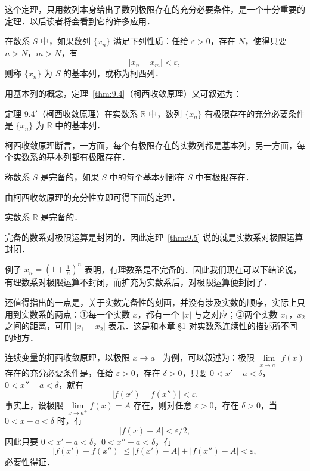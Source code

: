 这个定理，只用数列本身给出了数列极限存在的充分必要条件，是一个十分重要的定理．以后读者将会看到它的许多应用．

\begin{definition}\label{def:9.3}
在数系 $S$ 中，如果数列 $\{x_n\}$ 满足下列性质：任给 $\varepsilon > 0$，存在 $N$，使得只要 $n > N$，$m > N$，有
\[
|x_n - x_m| < \varepsilon,
\]
则称 $\{x_n\}$ 为 $S$ 的基本列，或称为柯西列．
\end{definition}

用基本列的概念，定理~\ref{thm:9.4}（柯西收敛原理）又可叙述为：

{\thmheadfont 定理 9.4$'$（柯西收敛原理）}\quad 在实数系 $\mathbb{R}$ 中，数列 $\{x_n\}$ 有极限存在的充分必要条件是 $\{x_n\}$ 为 $\mathbb{R}$ 中的基本列．

柯西收敛原理断言，一方面，每个有极限存在的实数列都是基本列，另一方面，每个实数系的基本列都有极限存在．

\begin{definition}\label{def:9.4}
称数系 $S$ 是完备的，如果 $S$ 中的每个基本列都在 $S$ 中有极限存在．
\end{definition}

由柯西收敛原理的充分性立即可得下面的定理．

\begin{theorem}[柯西]\label{thm:9.5}
实数系 $\mathbb{R}$ 是完备的．
\end{theorem}

完备的数系对极限运算是封闭的．因此定理~\ref{thm:9.5} 说的就是实数系对极限运算封闭．

例子 $x_n = \left( 1 + \frac{1}{n} \right)^n$ 表明，有理数系是不完备的．因此我们现在可以下结论说，有理数系对极限运算不封闭，而扩充为实数系后，对极限运算便封闭了．

还值得指出的一点是，关于实数完备性的刻画，并没有涉及实数的顺序，实际上只用到实数系的两点：①每一个实数 $x$，都有一个 $|x|$ 与之对应；②两个实数 $x_1$，$x_2$ 之间的距离，可用 $|x_1 - x_2|$ 表示．这是和本章 §1 对实数系连续性的描述所不同的地方．

连续变量的柯西收敛原理，以极限 $x \to a^+$ 为例，可以叙述为：极限 $\lim\limits_{x \to a^+} f(x)$ 存在的充分必要条件是，任给 $\varepsilon > 0$，存在 $\delta > 0$，只要 $0 < x' - a < \delta$，$0 < x'' - a < \delta$，就有
\[
|f(x') - f(x'')| < \varepsilon.
\]
事实上，设极限 $\lim\limits_{x \to a^+} f(x) = A$ 存在，则对任意 $\varepsilon > 0$，存在 $\delta > 0$，当 $0 < x - a < \delta$ 时，有
\[
|f(x) - A| < \varepsilon/2,
\]
因此只要 $0 < x' - a < \delta$，$0 < x'' - a < \delta$，有
\[
|f(x') - f(x'')| \leqslant |f(x') - A| + |f(x'') - A| < \varepsilon,
\]
必要性得证．

